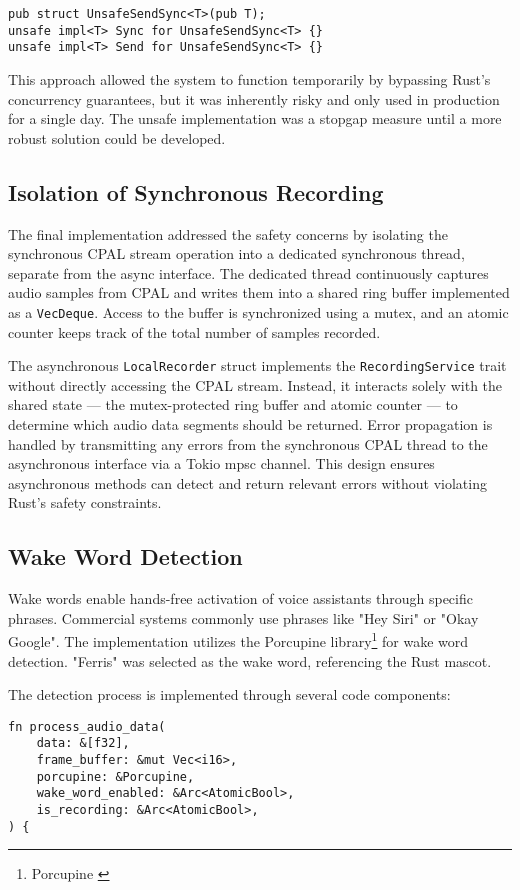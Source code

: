 \begin{verbatim}
pub struct UnsafeSendSync<T>(pub T);
unsafe impl<T> Sync for UnsafeSendSync<T> {}
unsafe impl<T> Send for UnsafeSendSync<T> {}
\end{verbatim}

This approach allowed the system to function temporarily by bypassing Rust's concurrency guarantees, but it was inherently risky and only used in production for a single day.
The unsafe implementation was a stopgap measure until a more robust solution could be developed.

\subsection{Isolation of Synchronous Recording}
The final implementation addressed the safety concerns by isolating the synchronous CPAL stream operation into a dedicated synchronous thread, separate from the async interface.
The dedicated thread continuously captures audio samples from CPAL and writes them into a shared ring buffer implemented as a \texttt{VecDeque}.
Access to the buffer is synchronized using a mutex, and an atomic counter keeps track of the total number of samples recorded.

The asynchronous \texttt{LocalRecorder} struct implements the \texttt{RecordingService} trait without directly accessing the CPAL stream.
Instead, it interacts solely with the shared state --- the mutex-protected ring buffer and atomic counter --- to determine which audio data segments should be returned.
Error propagation is handled by transmitting any errors from the synchronous CPAL thread to the asynchronous interface via a Tokio mpsc channel.
This design ensures asynchronous methods can detect and return relevant errors without violating Rust's safety constraints.

\subsection{Wake Word Detection}
Wake words enable hands-free activation of voice assistants through specific phrases.
Commercial systems commonly use phrases like "Hey Siri" or "Okay Google".
The implementation utilizes the Porcupine library\footnote{Porcupine \cite{porcupine}} for wake word detection.
"Ferris" was selected as the wake word, referencing the Rust mascot.

The detection process is implemented through several code components:

\begin{verbatim}
fn process_audio_data(
    data: &[f32],
    frame_buffer: &mut Vec<i16>,
    porcupine: &Porcupine,
    wake_word_enabled: &Arc<AtomicBool>,
    is_recording: &Arc<AtomicBool>,
) {
\end{verbatim}

